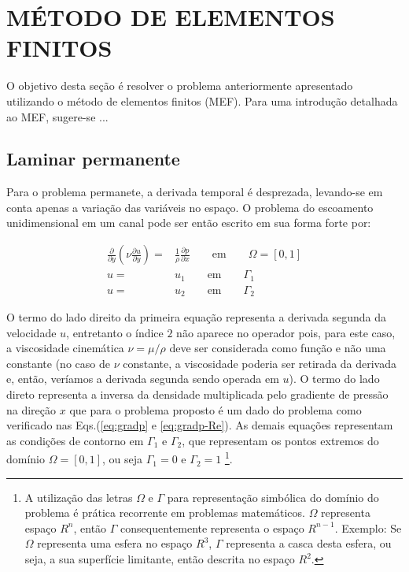 \typeout{ ====================================================================}
\typeout{ ====================================================================}


\section{MÉTODO DE ELEMENTOS FINITOS}

O objetivo desta seção é resolver o problema anteriormente apresentado
utilizando o método de elementos finitos (MEF). Para uma introdução
detalhada ao MEF, sugere-se ...

\subsection{Laminar permanente}

Para o problema permanete, a derivada temporal é desprezada, levando-se
em conta apenas a variação das variáveis no espaço. O problema do 
escoamento unidimensional em um canal pode ser então escrito em sua
forma forte por:

\begin{align}
	\frac{\partial}{\partial y} \left(\nu \frac{\partial u}
	{\partial y}\right)
	=&
	\frac{1}{\rho} \frac{\partial p}{\partial x}
	\qquad
	\text{em}
	\qquad
	\Omega=[0,1]
	\\
	u =& u_1 \qquad \text{em} \qquad \Gamma_1
	\\
	u =& u_2 \qquad \text{em} \qquad \Gamma_2
\label{eq:mef1}
\end{align}

O termo do lado direito da primeira equação representa a derivada
segunda da velocidade $u$, entretanto o índice $2$ não aparece no
operador pois, para este caso, a viscosidade cinemática $\nu=\mu/\rho$
deve ser considerada como função e não uma constante (no caso de $\nu$
constante, a viscosidade poderia ser retirada da derivada e, então,
veríamos a derivada segunda sendo operada em $u$). O termo do lado
direto representa a inversa da densidade multiplicada pelo gradiente de
pressão na direção $x$ que para o problema proposto é um dado do
problema como verificado nas Eqs.(\ref{eq:gradp} e \ref{eq:gradp-Re}). As
demais equações representam as condições de contorno em $\Gamma_1$ e
$\Gamma_2$, que representam os pontos extremos do domínio
$\Omega=[0,1]$, ou seja $\Gamma_1 = 0$ e $\Gamma_2 = 1$ \footnote{A
utilização das letras $\Omega$ e $\Gamma$ para representação simbólica
do domínio do problema é prática recorrente em problemas matemáticos.
$\Omega$ representa espaço $R^n$, então $\Gamma$ consequentemente
representa o espaço $R^{n-1}$. Exemplo: Se $\Omega$ representa uma
esfera no espaço $R^3$, $\Gamma$ representa a casca desta esfera, ou
seja, a sua superfície limitante, então descrita no espaço $R^2$.}.

